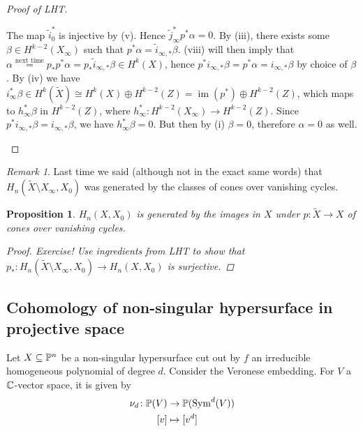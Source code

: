 \documentclass[A4paper, british]{amsart}
\theoremstyle{darkgreentheorem}
\newtheorem{prop}[thm]{Proposition}
\theoremstyle{darkbluedefinition}
\theoremstyle{darkredexample}
\theoremstyle{remark}
\newtheorem{rem}[thm]{Remark}
\DeclareMathOperator{\im}{im}
\newcommand{\1}{\mathbbm{1}}
\newcommand{\op}{\oplus}
\newcommand{\sub}{\subseteq}
\begin{document}
\begin{proof}[Proof of LHT]
\begin{enumerate}
\begin{center}
	    \end{center}
	    The map $\tilde{i}_{0}^{*}$ is injective by (v).
	    Hence $\tilde{j}_{\infty}^{*}p^{*}\alpha=0$.
	    By (iii), there exists some $\beta \in H^{k-2}(X_{\infty})$ such that $p^{*}\alpha=\tilde{i}_{\infty,*}\beta$.
	    (viii) will then imply that $\alpha\overset{\text{next time}}{=}p_{*}p^{*}\alpha=p_{*}\tilde{i}_{\infty,*}\beta\in H^{k}(X)$, hence $p^{*}i_{\infty,*}\beta =p^{*}\alpha =i_{\infty,*}\beta$ by choice of $\beta$.
	    By (iv) we have $i_{\infty}^{*}\beta \in H^{k}(\tilde{X})\cong H^{k}(X)\op H^{k-2}(Z)=\im(p^{*})\op H^{k-2}(Z)$, which maps to $h_{\infty}^{*}\beta$ in $H^{k-2}(Z)$, where $h_{\infty}^{*}\colon H^{k-2}(X_{\infty})\to H^{k-2}(Z)$.
	    Since $p^{*}i_{\infty,*}\beta = i_{\infty,*}\beta$, we have $h_{\infty}^{*}\beta=0$.
	    But then by (i) $\beta=0$, therefore $\alpha=0$ as well.
    \end{enumerate}
\end{proof}

\begin{rem}
    Last time we said (although not in the exact same words) that $H_{n}(\tilde{X}\setminus X_{\infty},X_{0})$ was generated by the classes of cones over vanishing cycles.
\end{rem}

\begin{prop}
    $H_{n}(X,X_{0})$ is generated by the images in $X$ under $p\colon \tilde{X}\to X$ of cones over vanishing cycles.
    \begin{proof}
	Exercise!
	Use ingredients from LHT to show that $p_{*}\colon H_{n}(\tilde{X}\setminus X_{\infty},X_{0})\to H_{n}(X,X_{0})$ is surjective.
    \end{proof}
\end{prop}

\subsection{Cohomology of non-singular hypersurface in projective space}

Let $X\sub \P^{n}$ be a non-singular hypersurface cut out by $f$ an irreducible homogeneous polynomial of degree $d$.
Consider the Veronese embedding.
For $V$ a $\C$-vector space, it is given by
\begin{align*}
    \nu_{d} \colon \P(V) & \to \P(\operatorname{Sym}^{d}(V)) \\
    [v] & \mapsto [v^{d}]
\end{align*}
\end{document}
